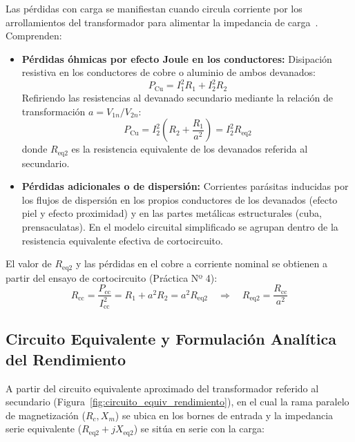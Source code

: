 Las pérdidas con carga se manifiestan cuando circula corriente por los arrollamientos del transformador para alimentar la impedancia de carga~\cite{chapman}. Comprenden:

\begin{itemize}
    \item \textbf{Pérdidas óhmicas por efecto Joule en los conductores:} Disipación resistiva en los conductores de cobre o aluminio de ambos devanados:
    \begin{equation}
        P_{\text{Cu}} = I_1^2 R_1 + I_2^2 R_2
    \end{equation}
    Refiriendo las resistencias al devanado secundario mediante la relación de transformación $a = V_{1n}/V_{2n}$:
    \begin{equation}
        P_{\text{Cu}} = I_2^2 \left( R_2 + \frac{R_1}{a^2} \right) = I_2^2 R_{\text{eq2}}
    \end{equation}
    donde $R_{\text{eq2}}$ es la resistencia equivalente de los devanados referida al secundario.
    \item \textbf{Pérdidas adicionales o de dispersión:} Corrientes parásitas inducidas por los flujos de dispersión en los propios conductores de los devanados (efecto piel y efecto proximidad) y en las partes metálicas estructurales (cuba, prensaculatas). En el modelo circuital simplificado se agrupan dentro de la resistencia equivalente efectiva de cortocircuito.
\end{itemize}

El valor de $R_{\text{eq2}}$ y las pérdidas en el cobre a corriente nominal se obtienen a partir del ensayo de cortocircuito (Práctica Nº 4):
\begin{equation}
    R_{\text{cc}} = \frac{P_{\text{cc}}}{I_{\text{cc}}^2} = R_1 + a^2 R_2 = a^2 R_{\text{eq2}} \quad \Longrightarrow \quad R_{\text{eq2}} = \frac{R_{\text{cc}}}{a^2}
\end{equation}

\subsection{Circuito Equivalente y Formulación Analítica del Rendimiento}

A partir del circuito equivalente aproximado del transformador referido al secundario (Figura~\ref{fig:circuito_equiv_rendimiento}), en el cual la rama paralelo de magnetización ($R_c, X_m$) se ubica en los bornes de entrada y la impedancia serie equivalente ($R_{\text{eq2}} + jX_{\text{eq2}}$) se sitúa en serie con la carga:

